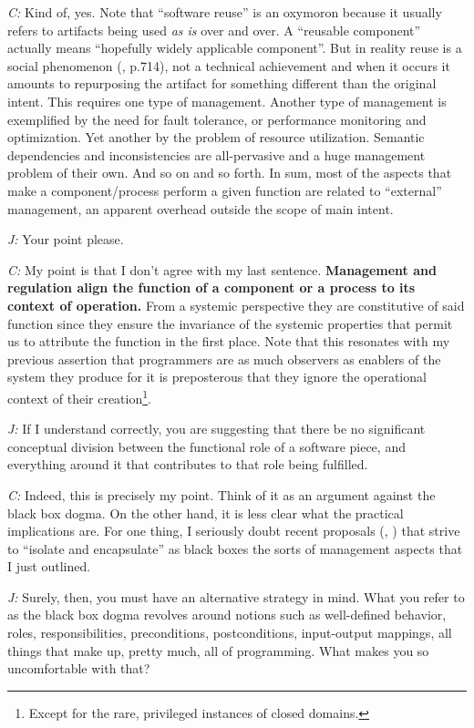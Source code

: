 \documentclass[10pt]{sigplanconf}
\begin{document}
\emph{C:} Kind of, yes. Note that ``software reuse'' is an oxymoron because it usually refers to artifacts being used \emph{as is} over and over. A ``reusable component'' actually means ``hopefully widely applicable component''. But in reality reuse is a social phenomenon (\cite{stroustrup}, p.714), not a technical achievement and when it occurs it amounts to repurposing the artifact for something different than the original intent. This requires one type of management. Another type of management is exemplified by the need for fault tolerance, or performance monitoring and optimization. Yet another by the problem of resource utilization. Semantic dependencies and inconsistencies are all-pervasive and a huge management problem of their own. And so on and so forth. In sum, most of the aspects that make a component/process perform a given function are related to ``external'' management, an apparent overhead outside the scope of main intent.

\emph{J:} Your point please.

\emph{C:} My point is that I don't agree with my last sentence. \textbf{Management and regulation align the function of a component or a process to its context of operation.} From a systemic perspective they are constitutive of said function since they ensure the invariance of the systemic properties that permit us to attribute the function in the first place. Note that this resonates with my previous assertion that programmers are as much observers as enablers of the system they produce for it is preposterous that they ignore the operational context of their creation\footnote{Except for the rare, privileged instances of closed domains.}.

\emph{J:} If I understand correctly, you are suggesting that there be no significant conceptual division between the functional role of a software piece, and everything around it that contributes to that role being fulfilled.

\emph{C:} Indeed, this is precisely my point. Think of it as an argument against the black box dogma. On the other hand, it is less clear what the practical implications are. For one thing, I seriously doubt recent proposals (\cite{gabriel}, \cite{rinard}) that strive to ``isolate and encapsulate'' as black boxes the sorts of management aspects that I just outlined.

\emph{J:} Surely, then, you must have an alternative strategy in mind. What you refer to as the black box dogma revolves around notions such as well-defined behavior, roles, responsibilities, preconditions, postconditions, input-output mappings, all things that make up, pretty much, all of programming. What makes you so uncomfortable with that?
\end{document}
